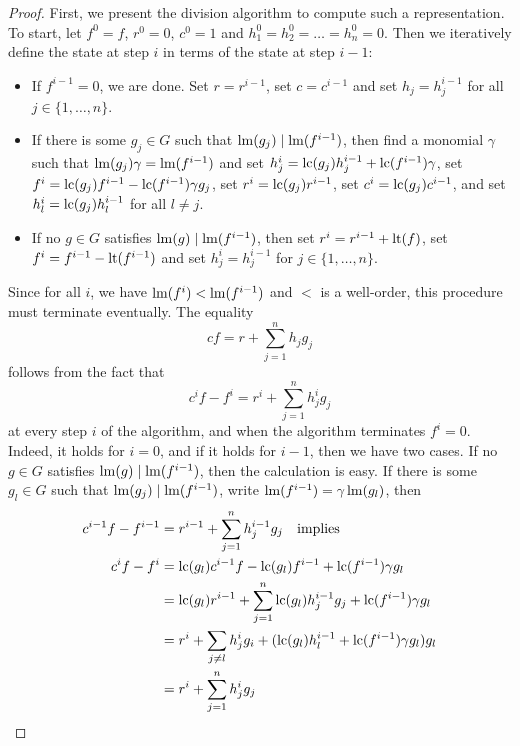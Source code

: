 \begin{proof}
  First, we present the division algorithm to compute such a representation. To start, let $f^{0} = f$, $r^{0} = 0$, $c^{0} = 1$ and $h_{1}^{0} = h_{2}^{0} = \dots = h_{n}^{0} = 0$. Then we iteratively define the state at step $i$ in terms of the state at step $i-1$:
  \begin{itemize}
    \item If $f^{i-1} = 0$, we are done. Set $r = r^{i-1}$, set $c = c^{i-1}$ and set $h_{j} = h_{j}^{i-1}$ for all $j \in \{1, \dots, n\}$.
    \item If there is some $g_{j} \in G$ such that $\operatorname{lm}(g_{j}) \mid \operatorname{lm}(f^{i-1})$, then find a monomial $\gamma$ such that $\operatorname{lm}(g_{j})\gamma = \operatorname{lm}(f^{i-1})$ and set $h_{j}^{i} = \operatorname{lc}(g_{j}) h_{j}^{i-1} + \operatorname{lc}(f^{i-1}) \gamma$, set $f^{i} = \operatorname{lc}(g_{j}) f^{i-1} - \operatorname{lc}(f^{i-1}) \gamma g_{j}$, set $r^{i} = \operatorname{lc}(g_{j}) r^{i-1}$, set $c^{i} = \operatorname{lc}(g_{j}) c^{i-1}$, and set $h_{l}^{i} = \operatorname{lc}(g_{j}) h_{l}^{i-1}$ for all $l \neq j$.
    \item If no $g \in G$ satisfies $\operatorname{lm}(g) \mid \operatorname{lm}(f^{i-1})$, then set $r^{i} = r^{i-1} + \operatorname{lt}(f)$, set $f^{i} = f^{i-1} - \operatorname{lt}(f^{i-1})$ and set $h_{j}^{i} = h_{j}^{i-1}$ for $j \in \{1, \dots, n\}$.
  \end{itemize}

  Since for all $i$, we have $\operatorname{lm}(f^{i}) < \operatorname{lm}(f^{i-1})$ and $<$ is a well-order, this procedure must terminate eventually. The equality
  \[c f = r + \sum_{j=1}^{n} h_{j} g_{j}\] follows from the fact that
  \[c^{i} f - f^{i} = r^{i} + \sum_{j=1}^{n} h^{i}_{j} g_{j}\]
  at every step $i$ of the algorithm, and when the algorithm terminates $f^{i} = 0$. Indeed, it holds for $i=0$, and if it holds for $i-1$, then we have two cases. If no $g \in G$ satisfies $\operatorname{lm}(g) \mid \operatorname{lm}(f^{i-1})$, then the calculation is easy. If there is some $g_{l} \in G$ such that $\operatorname{lm}(g_{j}) \mid \operatorname{lm}(f^{i-1})$, write $\operatorname{lm}(f^{i-1}) = \gamma \operatorname{lm}(g_{l})$, then
  \begin{align*}
    c^{i-1} f - f^{i-1} &= r^{i-1} + \sum_{j=1}^{n} h^{i-1}_{j} g_{j} \quad \text{implies} \\
    c^{i} f - f^{i} &= \operatorname{lc}(g_{l}) c^{i-1} f - \operatorname{lc}(g_{l}) f^{i-1} + \operatorname{lc}(f^{i-1})\gamma g_{l} \\
                        &= \operatorname{lc}(g_{l}) r^{i - 1} + \sum_{j=1}^{n} \operatorname{lc}(g_{l}) h^{i-1}_{j}g_{j} + \operatorname{lc}(f^{i-1})\gamma g_{l} \\
                        &= r^{i} + \sum_{j \neq l} h^{i}_{j} g_{i} + (\operatorname{lc}(g_{l})h^{i - 1}_{l} + \operatorname{lc}(f^{i-1})\gamma g_{l})g_{l} \\
                        &= r^{i} + \sum_{j=1}^{n} h^{i}_{j} g_{j}
  \end{align*}



\end{proof}
